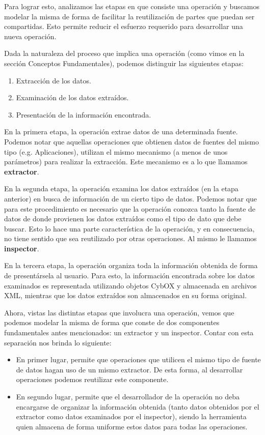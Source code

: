 Para lograr esto, analizamos las etapas en que consiste una operación y buscamos modelar la misma de forma de facilitar la reutilización de partes que puedan ser compartidas. Esto permite reducir el esfuerzo requerido para desarrollar una nueva operación.

Dada la naturaleza del proceso que implica una operación (como vimos en la sección Conceptos Fundamentales), podemos distinguir las siguientes etapas:
\begin{enumerate}
\item Extracción de los datos.
\item Examinación de los datos extraídos.
\item Presentación de la información encontrada.
\end{enumerate}

En la primera etapa, la operación extrae datos de una determinada fuente. Podemos notar que aquellas operaciones que obtienen datos de fuentes del mismo tipo (e.g. Aplicaciones), utilizan el mismo mecanismo (a menos de unos parámetros) para realizar la extracción. Este mecanismo es a lo que llamamos \textbf{extractor}.

En la segunda etapa, la operación examina los datos extraídos (en la etapa anterior) en busca de información de un cierto tipo de datos. Podemos notar que para este procedimiento es necesario que la operación conozca tanto la fuente de datos de donde provienen los datos extraídos como el tipo de dato que debe buscar. Esto lo hace una parte característica de la operación, y en consecuencia, no tiene sentido que sea reutilizado por otras operaciones. Al mismo le llamamos \textbf{inspector}.

En la tercera etapa, la operación organiza toda la información obtenida de forma de presentársela al usuario. Para esto, la información encontrada sobre los datos examinados es representada utilizando objetos CybOX y almacenada en archivos XML, mientras que los datos extraídos son almacenados en su forma original.

Ahora, vistas las distintas etapas que involucra una operación, vemos que podemos modelar la misma de forma que conste de dos componentes fundamentales antes mencionados: un extractor y un inspector. Contar con esta separación nos brinda lo siguiente:

\begin{itemize}
\item En primer lugar, permite que operaciones que utilicen el mismo tipo de fuente de datos hagan uso de un mismo extractor. De esta forma, al desarrollar operaciones podemos reutilizar este componente.
\item En segundo lugar, permite que el desarrollador de la operación no deba encargarse de organizar la información obtenida (tanto datos obtenidos por el extractor como datos examinados por el inspector), siendo la herramienta quien almacena de forma uniforme estos datos para todas las operaciones.
\end{itemize}

